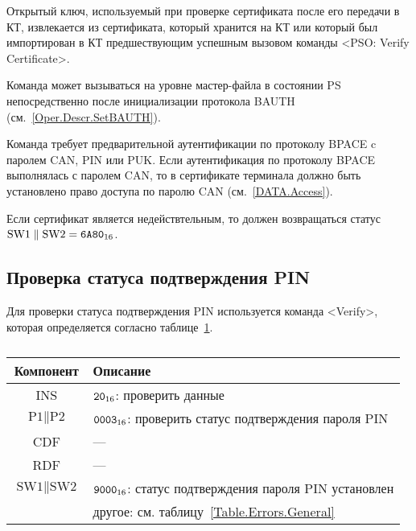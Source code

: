 Открытый ключ, используемый при проверке сертификата после его передачи в
КТ, извлекается из сертификата, который хранится на КТ или который был 
импортирован в КТ предшествующим успешным вызовом команды <PSO: Verify Certificate>.


Команда может вызываться на уровне мастер-файла 
в состоянии PS непосредственно после 
инициализации протокола BAUTH (см.~\ref{Oper.Descr.SetBAUTH}).

Команда требует предварительной аутентификации по протоколу BPACE 
c паролем CAN, PIN или PUK. Если аутентификация 
по протоколу BPACE выполнялась с паролем CAN,
то в сертификате терминала должно быть установлено 
право доступа по паролю CAN  (см.~\ref{DATA.Access}).

Если сертификат является недействтельным, то должен 
возвращаться статус $\text{SW1} \parallel \text{SW2} = \texttt{6A80}_{16}$.

\subsection{Проверка статуса подтверждения PIN}
\label{Oper.Descr.VerifyAuth}

Для проверки статуса подтверждения PIN
используется команда <Verify>, 
которая определяется согласно 
таблице~\ref{Table.Oper.VerifyAuthCmd}.

\begin{table}[hbt]
\caption{}\label{Table.Oper.VerifyAuthCmd}
\begin{tabular}{|c|p{14cm}|}
\hline
Компонент & Описание \\
\hline
\hline
INS & $\texttt{20}_{16}$: проверить данные\\
\hline
$\text{P1} \parallel \text{P2}$ & $\texttt{0003}_{16}$: проверить статус подтверждения пароля PIN \\
\hline
CDF & --- \\
\hline 
RDF &  --- \\
\hline
$\text{SW1} \parallel \text{SW2}$ & $\texttt{9000}_{16}$: 
 статус подтверждения пароля PIN установлен\\
 & другое: см. таблицу~\ref{Table.Errors.General} \\
\hline
\end{tabular}
\end{table}

